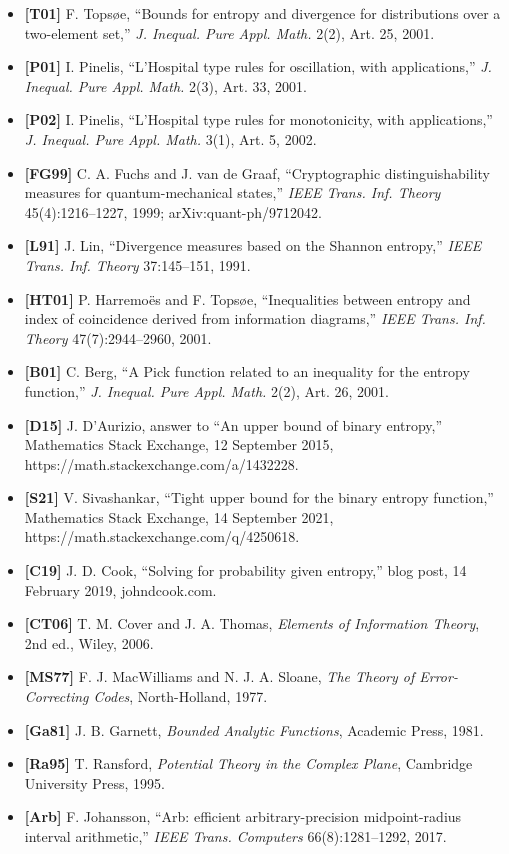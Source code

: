 \documentclass[
  11pt,
]{article}
\providecommand{\tightlist}{%
  \setlength{\itemsep}{0pt}\setlength{\parskip}{0pt}}
\begin{document}
\begin{itemize}
\tightlist
\item
  \textbf{{[}T01{]}} F. Topsøe, ``Bounds for entropy and divergence for
  distributions over a two-element set,'' \emph{J. Inequal. Pure Appl.
  Math.} 2(2), Art. 25, 2001.
\item
  \textbf{{[}P01{]}} I. Pinelis, ``L'Hospital type rules for
  oscillation, with applications,'' \emph{J. Inequal. Pure Appl. Math.}
  2(3), Art. 33, 2001.
\item
  \textbf{{[}P02{]}} I. Pinelis, ``L'Hospital type rules for
  monotonicity, with applications,'' \emph{J. Inequal. Pure Appl. Math.}
  3(1), Art. 5, 2002.
\item
  \textbf{{[}FG99{]}} C. A. Fuchs and J. van de Graaf, ``Cryptographic
  distinguishability measures for quantum-mechanical states,''
  \emph{IEEE Trans. Inf. Theory} 45(4):1216--1227, 1999;
  arXiv:quant-ph/9712042.
\item
  \textbf{{[}L91{]}} J. Lin, ``Divergence measures based on the Shannon
  entropy,'' \emph{IEEE Trans. Inf. Theory} 37:145--151, 1991.
\item
  \textbf{{[}HT01{]}} P. Harremoës and F. Topsøe, ``Inequalities between
  entropy and index of coincidence derived from information diagrams,''
  \emph{IEEE Trans. Inf. Theory} 47(7):2944--2960, 2001.
\item
  \textbf{{[}B01{]}} C. Berg, ``A Pick function related to an inequality
  for the entropy function,'' \emph{J. Inequal. Pure Appl. Math.} 2(2),
  Art. 26, 2001.
\item
  \textbf{{[}D15{]}} J. D'Aurizio, answer to ``An upper bound of binary
  entropy,'' Mathematics Stack Exchange, 12 September 2015,
  https://math.stackexchange.com/a/1432228.
\item
  \textbf{{[}S21{]}} V. Sivashankar, ``Tight upper bound for the binary
  entropy function,'' Mathematics Stack Exchange, 14 September 2021,
  https://math.stackexchange.com/q/4250618.
\item
  \textbf{{[}C19{]}} J. D. Cook, ``Solving for probability given
  entropy,'' blog post, 14 February 2019, johndcook.com.
\item
  \textbf{{[}CT06{]}} T. M. Cover and J. A. Thomas, \emph{Elements of
  Information Theory}, 2nd ed., Wiley, 2006.
\item
  \textbf{{[}MS77{]}} F. J. MacWilliams and N. J. A. Sloane, \emph{The
  Theory of Error-Correcting Codes}, North-Holland, 1977.
\item
  \textbf{{[}Ga81{]}} J. B. Garnett, \emph{Bounded Analytic Functions},
  Academic Press, 1981.
\item
  \textbf{{[}Ra95{]}} T. Ransford, \emph{Potential Theory in the Complex
  Plane}, Cambridge University Press, 1995.
\item
  \textbf{{[}Arb{]}} F. Johansson, ``Arb: efficient arbitrary-precision
  midpoint-radius interval arithmetic,'' \emph{IEEE Trans. Computers}
  66(8):1281--1292, 2017.
\end{itemize}
\end{document}
